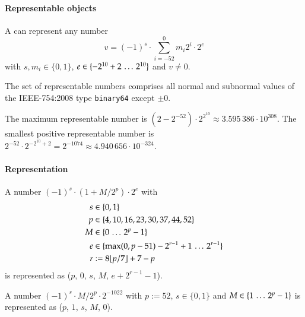 \paragraph{Representable objects}

A \DborBinaryRationalValue{} can represent any number
\begin{equation}
    v = (-1)^s \cdot \sum_{i = -52}^0 m_i 2^i \cdot 2^e
\end{equation}
with $s, m_i \in \{0, 1\}$, $e \in \{-2^{10} + 2 \,\ldots\, 2^{10}\}$ and $v \ne 0$.

The set of representable numbers comprises all normal and subnormal values of the IEEE-754:2008 type
\texttt{binary64} except $\pm 0$.

\smallskip
The maximum representable number is $(2 - 2^{-52}) \cdot 2^{2^{10}} \approx 3.595\,386 \cdot 10^{308}$.
The smallest positive representable number is $2^{-52} \cdot 2^{-2^{10} + 2} = 2^{-1074}
\approx 4.940\,656 \cdot 10^{-324}$.

\paragraph{Representation}

A number $(-1)^s \cdot (1 + M/2^p) \cdot 2^e$ with
\begin{align*}
    s & \in \{0, 1\} \\
    p & \in \{4, 10, 16, 23, 30, 37, 44, 52\} \\
    M & \in \{0 \,\ldots\, 2^p - 1\} \\
    e & \in \{\max(0, p - 51) - 2^{r - 1} + 1 \,\ldots\, 2^{r - 1}\} \\
    r & := 8 \lfloor p / 7 \rfloor + 7 - p
\end{align*}%
is represented as
\DborBinaryRationalToken*($p$, $0$, $s$, $M$, $e + 2^{r - 1} - 1$).

A number $(-1)^s \cdot M/2^p \cdot 2^{-1022}$ with $p := 52$, $s \in \{0, 1\}$ and
$M \in \{1 \,\ldots\, 2^p - 1\}$ is represented as \DborBinaryRationalToken*($p$, $1$, $s$, $M$, $0$).

